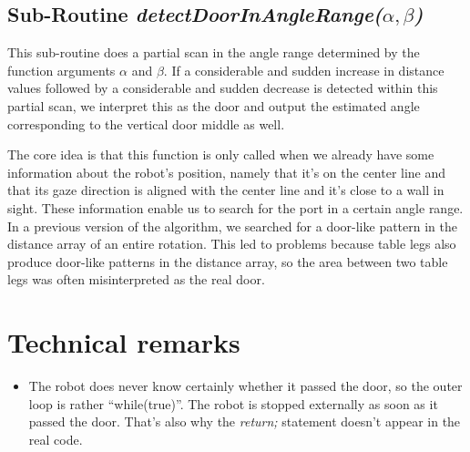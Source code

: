 \documentclass{article}
\begin{document}
\subsection{Sub-Routine \textit{detectDoorInAngleRange($\alpha, \beta$)}}
This sub-routine does a partial scan in the angle range determined by the function arguments
$\alpha$ and $\beta$. 
If a considerable and sudden increase in distance values followed by a considerable and sudden decrease is 
detected within this partial scan, we interpret this as the door and output the estimated angle corresponding to the vertical door middle as well.
 
The core idea is that this function is only called when we already have some information about 
the robot's position, namely that it's on the center line and that its gaze direction is aligned
with the center line and it's close to a wall in sight.
These information enable us to search for the port in a certain angle range.
In a previous version of the algorithm, we searched for a door-like pattern in the distance array of an entire rotation.
This led to problems because table legs also produce door-like patterns in the distance array, so the area between two table legs was often misinterpreted as the real door.




\section{Technical remarks}
\begin{itemize}
	\item The robot does never know certainly whether it passed the door, so the outer loop is rather \enquote{while(true)}. The robot is stopped externally as soon as it passed the door.
	That's also why the \textit{return;} statement doesn't appear in the real code.
\end{itemize}
\end{document}

